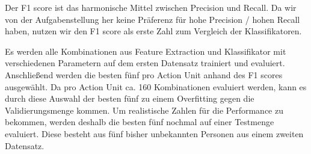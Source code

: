 Der F1 score ist das harmonische Mittel zwischen Precision und Recall. Da wir
von der Aufgabenstellung her keine Präferenz für hohe Precision / hohen Recall
haben, nutzen wir den F1 score als erste Zahl zum Vergleich der Klassifikatoren.

Es werden alle Kombinationen aus Feature Extraction und Klassifikator mit verschiedenen Parametern
auf dem ersten Datensatz trainiert und evaluiert. Anschließend werden die besten
fünf pro Action Unit anhand des F1 scores ausgewählt. Da pro Action Unit ca. 160
Kombinationen evaluiert werden, kann es durch diese Auswahl der besten fünf zu
einem Overfitting gegen die Validierungsmenge kommen. Um realistische Zahlen für
die Performance zu bekommen, werden deshalb die besten fünf nochmal auf einer
Testmenge evaluiert. Diese besteht aus fünf bisher unbekannten Personen aus
einem zweiten Datensatz.



